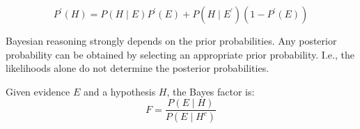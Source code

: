 \begin{thm}
  \label{thm:2:JeffreysRule}
  \begin{equation}
    \label{eqn:2:JeffreysRule}
    P^\prime(H) = P(H \mid E) P^\prime(E) + P(H \mid E^\prime) (1 - P^\prime(E))
  \end{equation}
\end{thm}

Bayesian reasoning strongly
depends on the prior probabilities.
Any posterior probability can be obtained by selecting an appropriate prior
probability.
I.e., the likelihoods alone do not determine the posterior probabilities.

\begin{dfn}
  \label{def:2:BayesFactor}

  Given evidence $E$ and a hypothesis $H$, the Bayes factor is:
  \begin{equation}
    \label{eqn:2:BayesFactor}
    F = \frac{P(E \mid H)}{P(E \mid H^c)}
  \end{equation}
\end{dfn}
